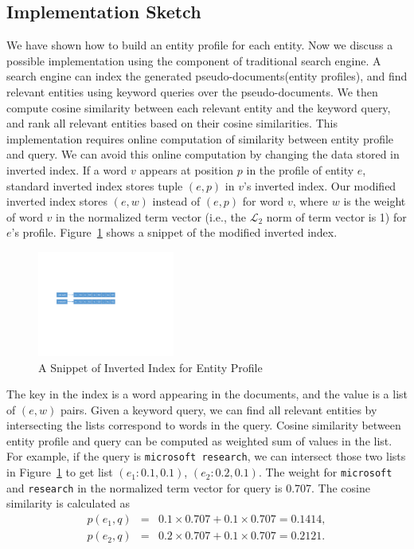 \documentclass{sig-alternate}
\theoremstyle{definition}
\begin{document}
\subsection{Implementation Sketch}\label{sec:profileimp}
We have shown how to build an entity profile for each entity. Now we discuss a possible implementation using the component of traditional search engine. A search engine can index the generated pseudo-documents(entity profiles), and find relevant entities using keyword queries over the pseudo-documents. We then compute cosine similarity between each relevant entity and the keyword query, and rank all relevant entities based on their cosine similarities. This implementation requires online computation of similarity between entity profile and query. We can avoid this online computation by changing the data stored in inverted index. If a word $v$ appears at position $p$ in the profile of entity $e$, standard inverted index stores tuple $(e, p)$ in $v$'s inverted index. Our modified inverted index stores $(e, w)$ instead of $(e, p)$ for word $v$, where $w$ is the weight of word $v$ in the normalized term vector (i.e., the $\mathcal{L}_2$ norm of term vector is 1) for $e$'s profile. Figure~\ref{fig:index1} shows a snippet of the modified inverted index.
\begin{figure}[htbp]
\center
\includegraphics[width=0.4\textwidth]{img/index1.pdf}
\caption{A Snippet of Inverted Index for Entity Profile\label{fig:index1}}
\end{figure}
The key in the index is a word appearing in the documents, and the value is a list of $(e, w)$ pairs. Given a keyword query, we can find all relevant entities by intersecting the lists correspond to words in the query. Cosine similarity between entity profile and query can be computed as weighted sum of values in the list. For example, if the query is {\tt microsoft research}, we can intersect those two lists in Figure~\ref{fig:index1} to get list $(e_1: 0.1, 0.1)$, $(e_2: 0.2, 0.1)$. The weight for {\tt microsoft} and {\tt research} in the normalized term vector for query is 0.707. The cosine similarity is calculated as
\begin{eqnarray}
p(e_1, q) & = & 0.1 \times 0.707 + 0.1 \times 0.707 = 0.1414, \nonumber \\
p(e_2, q) & = & 0.2 \times 0.707 + 0.1 \times 0.707 = 0.2121. \nonumber
\end{eqnarray}
\end{document}
